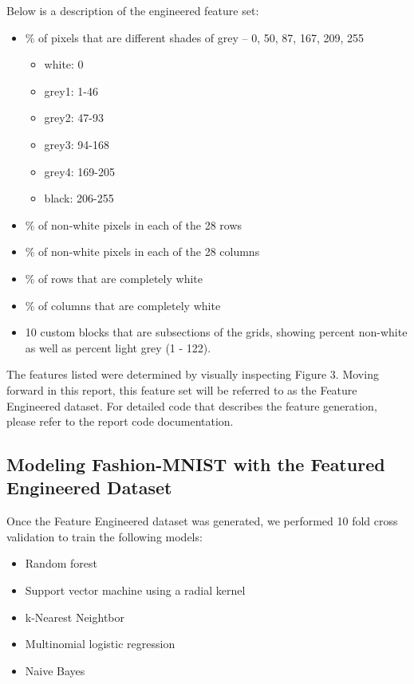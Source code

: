 \documentclass{article}
\begin{document}
Below is a description of the engineered feature set:

\begin{itemize}
\tightlist
\item
  \% of pixels that are different shades of grey -- 0, 50, 87, 167, 209,
  255

  \begin{itemize}
  \tightlist
  \item
    white: 0
  \item
    grey1: 1-46
  \item
    grey2: 47-93
  \item
    grey3: 94-168
  \item
    grey4: 169-205\\
  \item
    black: 206-255
  \end{itemize}
\item
  \% of non-white pixels in each of the 28 rows
\item
  \% of non-white pixels in each of the 28 columns
\item
  \% of rows that are completely white
\item
  \% of columns that are completely white
\item
  10 custom blocks that are subsections of the grids, showing percent
  non-white as well as percent light grey (1 - 122).
\end{itemize}

The features listed were determined by visually inspecting Figure 3.
Moving forward in this report, this feature set will be referred to as
the Feature Engineered dataset. For detailed code that describes the
feature generation, please refer to the report code documentation.

\hypertarget{modeling-fashion-mnist-with-the-featured-engineered-dataset}{%
\subsection{Modeling Fashion-MNIST with the Featured Engineered
Dataset}\label{modeling-fashion-mnist-with-the-featured-engineered-dataset}}

Once the Feature Engineered dataset was generated, we performed 10 fold
cross validation to train the following models:

\begin{itemize}
\tightlist
\item
  Random forest
\item
  Support vector machine using a radial kernel
\item
  k-Nearest Neightbor
\item
  Multinomial logistic regression
\item
  Naive Bayes
\end{itemize}
\end{document}
